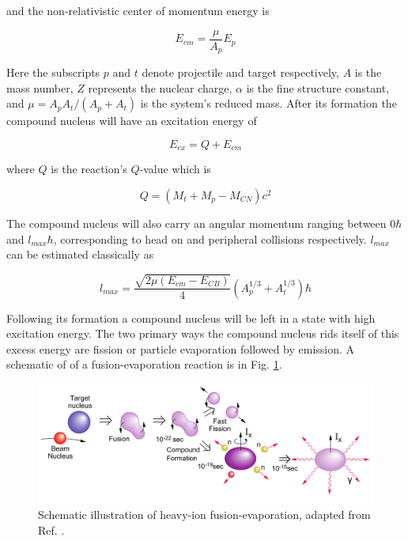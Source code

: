 and the non-relativistic center of momentum energy is

\begin{equation}
\label{eqn:chp3-cmf_en}
E_{cm} = \frac{\mu}{A_{p}}E_{p}
\end{equation}

Here the subscripts $p$ and $t$ denote projectile and target respectively, $A$ is the mass number, $Z$ represents the nuclear charge, $\alpha{}$ is the fine structure constant, and $\mu = A_{p}A_{t}/(A_{p}+A_{t})$ is the system's reduced mass. After its formation the compound nucleus will have an excitation energy of

\begin{equation}
\label{eqn:chp3-cn_ex}
E_{ex} = Q + E_{cm}
\end{equation}

where $Q$ is the reaction's $Q$-value which is

\begin{equation}
\label{eqn:chp3-cn_form_qvalue}
Q = (M_t+M_p-M_{CN})c^2
\end{equation}

The compound nucleus will also carry an angular momentum ranging between $0 \hbar$ and $l_{max} \hbar$, corresponding to head on and peripheral collisions respectively. $l_{max}$ can be estimated classically as

\begin{equation}
\label{eqn:chp3-cn_lmax}
l_{max} = \frac{\sqrt{2\mu(E_{cm}-E_{CB})}}{4}(A^{1/3}_p + A^{1/3}_t)\hbar
\end{equation}

Following its formation a compound nucleus will be left in a state with high excitation energy. The two primary ways the compound nucleus rids itself of this excess energy are fission\cite{fastFission} or particle evaporation followed by \gr{} emission. A schematic of of a fusion-evaporation reaction is in Fig. \ref{fig:chp3-fus-evap-schem}.

\begin{figure}[h!]
	\centerline{\includegraphics[width=\textwidth]{./img/c3/fusion_evaporation.pdf}}
	\caption{Schematic illustration of heavy-ion fusion-evaporation, adapted from Ref. \cite{gsBooklet}.}
	\label{fig:chp3-fus-evap-schem}
\end{figure}

